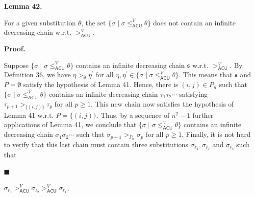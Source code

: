 \documentclass[10pt,a4paper]{amsart}
\begin{document}
 
\par\medskip\noindent\textbf{Lemma 42.}\par
 
 
For a given substitution $\theta$, the set $\{\sigma\mid\sigma\leq_{\mathsf{ACU}}^{V}\theta\}$ does not contain an infinite decreasing chain w.r.t. $>_{\mathsf{ACU}}^{V}$.\par
 
 
 
 
 
\par\medskip\noindent\textbf{Proof.}\par
 
 
Suppose $\{\sigma\mid\sigma\leq_{\mathsf{ACU}}^{V}\theta\}$ contains an infinite decreasing chain $\mathfrak{s}$ w.r.t. $>_{\mathsf{ACU}}^{V}$. By Definition 36, we have $\eta>_{\emptyset}\eta^{\prime}$ for all $\eta,\eta^{\prime}\in\{\sigma\mid\sigma\leq_{\mathsf{ACU}}^{V}\theta\}$. This means that $\mathfrak{s}$ and $P=\emptyset$ satisfy the hypothesis of Lemma 41. Hence, there is $(i,j)\in P_{n}$ such that $\{\sigma\mid\sigma\leq_{\mathsf{ACU}}^{V}\theta\}$ contains an infinite decreasing chain $\tau_{1}\tau_{2}\cdots$ satisfying $\tau_{p+1}>_{\{(i,j)\}}\tau_{p}$ for all $p\geq 1$. This new chain now satisfies the hypothesis of Lemma 41 w.r.t. $P=\{(i,j)\}$. Thus, by a sequence of $n^{2}-1$ further applications of Lemma 41, we conclude that $\{\sigma\mid\sigma\leq_{\mathsf{ACU}}^{V}\theta\}$ contains an infinite decreasing chain $\sigma_{1}\sigma_{2}\cdots$ such that $\sigma_{p+1}>_{P_{n}}\sigma_{p}$ for all $p\geq 1$. Finally, it is not hard to verify that this last chain must contain three substitutions $\sigma_{\ell_{1}},\sigma_{\ell_{2}}$ and $\sigma_{\ell_{3}}$ such that\par
  
\par\noindent  $\blacksquare$ 
 
$\sigma_{\ell_{3}}>_{\mathsf{ACU}}^{V}\sigma_{\ell_{2}}>_{\mathsf{ACU}}^{V}%
\sigma_{\ell_{1}}$,\par
 
 
\end{document}
